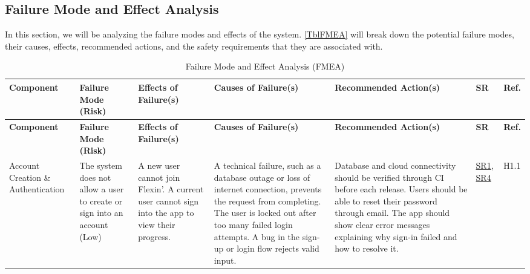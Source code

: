 \documentclass{article}
\begin{document}
\begin{landscape}
\section{Failure Mode and Effect Analysis}
In this section, we will be analyzing the failure modes and effects of the system. \autoref{TblFMEA} will break down the potential failure modes, their causes, effects, recommended actions, and the safety requirements that they are associated with.
    {
        \renewcommand{\arraystretch}{1.1}
        \footnotesize
        \setlength{\tabcolsep}{4pt}
        \begin{longtable}{|p{2.5cm}|p{3cm}|p{3.8cm}|p{3.8cm}|p{5.5cm}|p{1.8cm}|p{1cm}|}
            \caption{Failure Mode and Effect Analysis (FMEA)} \label{TblFMEA} \\
            \hline
            \textbf{Component} & \textbf{Failure Mode (Risk)} & \textbf{Effects of Failure(s)} & \textbf{Causes of Failure(s)} & \textbf{Recommended Action(s)} & \textbf{SR} & \textbf{Ref.} \\
            \hline
            \endfirsthead
            \hline
            \textbf{Component} & \textbf{Failure Mode (Risk)} & \textbf{Effects of Failure(s)} & \textbf{Causes of Failure(s)} & \textbf{Recommended Action(s)} & \textbf{SR} & \textbf{Ref.} \\
            \hline
            \endhead
            Account Creation \& Authentication & The system does not allow a user to create or sign into an account (Low) & \textbullet{} A new user cannot join Flexin'.\newline \textbullet{} A current user cannot sign into the app to view their progress. & \textbullet{} A technical failure, such as a database outage or loss of internet connection, prevents the request from completing. \newline \textbullet{} The user is locked out after too many failed login attempts. \newline \textbullet{} A bug in the sign-up or login flow rejects valid input. & \textbullet{} Database and cloud connectivity should be verified through CI before each release. \newline \textbullet{} Users should be able to reset their password through email. \newline \textbullet{} The app should show clear error messages explaining why sign-in failed and how to resolve it. & \hyperlink{sr1}{SR1}, \hyperlink{sr4}{SR4} & H1.1 \\
            \hline

\end{longtable}}
\end{landscape}
\end{document}
